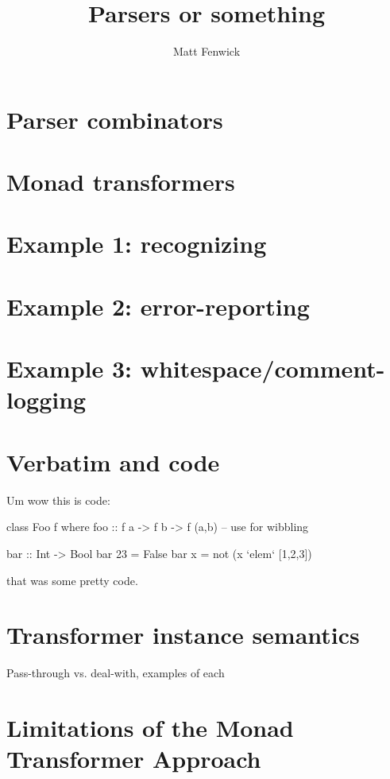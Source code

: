 \documentclass{tmr}
\title{Parsers or something}
\author{Matt Fenwick\email{mfenwick100@gmail.com}}
\begin{document}
\begin{introduction}
\end{introduction}

\section{Parser combinators}

\section{Monad transformers}

\section{Example 1: recognizing}

\section{Example 2: error-reporting}

\section{Example 3: whitespace/comment-logging}



\section{Verbatim and code}

Um wow this is code:
\begin{spec}
class Foo f where
  foo :: f a -> f b -> f (a,b)
  -- use for wibbling

bar :: Int -> Bool
bar  23  =  False
bar  x   =  not (x `elem` [1,2,3])

\end{spec}
that was some pretty code.


\section{Transformer instance semantics}

Pass-through vs. deal-with, examples of each


\section{Limitations of the Monad Transformer Approach}
\end{document}
